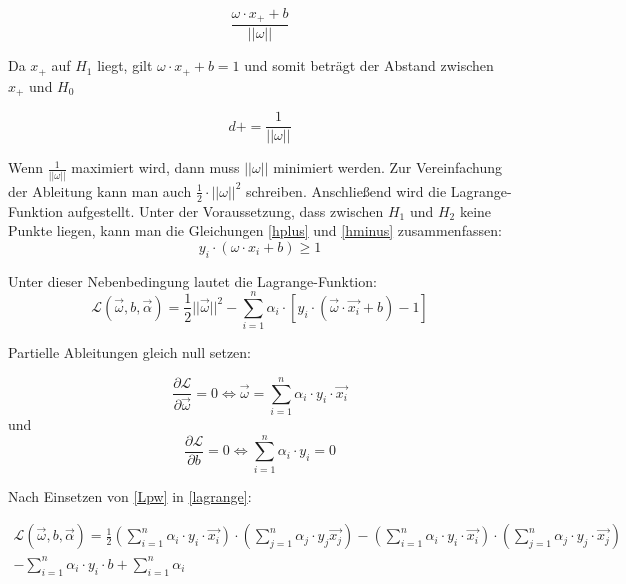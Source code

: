 \documentclass[11pt,ceqn]{book}
\begin{document}
$$\frac{\omega \cdot x_+ +b}{||\omega||}$$

Da $x_+$ auf $H_1$ liegt, gilt $\omega \cdot x_+ +b = 1$ und somit beträgt der Abstand zwischen $x_+$ und $H_0$ 

$$d+ = \frac{1}{||\omega||}$$

Wenn $\frac{1}{||\omega||}$ maximiert wird, dann muss $||\omega||$ minimiert werden. Zur Vereinfachung der Ableitung kann man auch $\frac{1}{2} \cdot ||\omega||^2$ schreiben. Anschließend wird die Lagrange-Funktion aufgestellt. Unter der Voraussetzung, dass zwischen $H_1$ und $H_2$ keine Punkte liegen, kann man die Gleichungen \eqref{hplus} und \eqref{hminus} zusammenfassen:
\begin{equation}
y_i \cdot (\omega \cdot x_i + b) \geqslant 1
\end{equation}

Unter dieser Nebenbedingung lautet die Lagrange-Funktion:
\begin{equation} \label{lagrange}
\mathcal{L}(\vec{\omega},b,\vec{\alpha}) = \frac{1}{2}||\vec{\omega}||^2 - \sum_{i=1}^n \alpha_i \cdot \left[y_i \cdot (\vec{\omega} \cdot \vec{x_i} + b) - 1\right]
\end{equation}

Partielle Ableitungen gleich null setzen:

\begin{equation} \label{Lpw}
\frac{\partial \mathcal{L}}{\partial \vec{\omega}} = 0 \Leftrightarrow \vec{\omega} = \sum_{i=1}^n \alpha_i \cdot y_i \cdot \vec{x_i}
\end{equation}
und
\begin{equation} \label{Lpb}
\frac{\partial \mathcal{L}}{\partial b} = 0 \Leftrightarrow \sum_{i=1}^n \alpha_i \cdot y_i = 0
\end{equation} 

Nach Einsetzen von \eqref{Lpw} in \eqref{lagrange}:

\begin{equation} \label{lagrange2}
\begin{split}
\mathcal{L}(\vec{\omega},b,\vec{\alpha}) = \frac{1}{2}\left(\sum_{i=1}^n \alpha_i \cdot y_i \cdot \vec{x_i}\right)\cdot \left(\sum_{j=1}^n \alpha_j \cdot y_j \vec{x_j}\right) - \left(\sum_{i=1}^n \alpha_i \cdot y_i \cdot \vec{x_i}\right) \cdot \left(\sum_{j=1}^n \alpha_j \cdot y_j \cdot \vec{x_j}\right)\\ - \sum_{i=1}^n \alpha_i \cdot y_i \cdot b + \sum_{i=1}^n \alpha_i
\end{split}
\end{equation}
\end{document}
